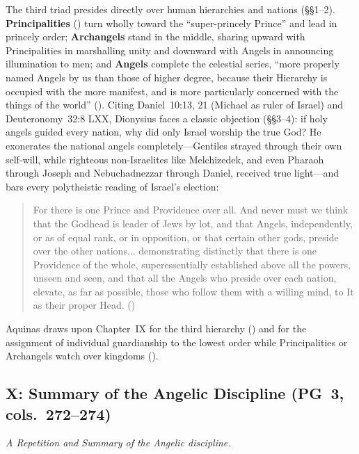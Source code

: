 The third triad presides directly over human hierarchies and nations (\S\S 1--2). \textbf{Principalities} () turn wholly toward the ``super-princely Prince'' and lead in princely order; \textbf{Archangels} stand in the middle, sharing upward with Principalities in marshalling unity and downward with Angels in announcing illumination to men; and \textbf{Angels} complete the celestial series, ``more properly named Angels by us than those of higher degree, because their Hierarchy is occupied with the more manifest, and is more particularly concerned with the things of the world'' (). Citing Daniel~10:13, 21 (Michael as ruler of Israel) and Deuteronomy~32:8 LXX, Dionysius faces a classic objection (\S\S 3--4): if holy angels guided every nation, why did only Israel worship the true God? He exonerates the national angels completely---Gentiles strayed through their own self-will, while righteous non-Israelites like Melchizedek, and even Pharaoh through Joseph and Nebuchadnezzar through Daniel, received true light---and bars every polytheistic reading of Israel's election:
\begin{quotation}
For there is one Prince and Providence over all. And never must we think that the Godhead is leader of Jews by lot, and that Angels, independently, or as of equal rank, or in opposition, or that certain other gods, preside over the other nations... demonstrating distinctly that there is one Providence of the whole, superessentially established above all the powers, unseen and seen, and that all the Angels who preside over each nation, elevate, as far as possible, those who follow them with a willing mind, to It as their proper Head. ()
\end{quotation}
Aquinas draws upon Chapter~IX for the third hierarchy () and for the assignment of individual guardianship to the lowest order while Principalities or Archangels watch over kingdoms ().

\subsection{X: Summary of the Angelic Discipline (PG~3, cols.~272--274)}
\label{sec:ch-x}
\emph{A Repetition and Summary of the Angelic discipline.}

